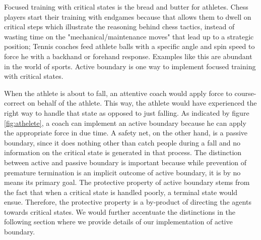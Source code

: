 \documentclass[journal]{IEEEtran}
\begin{document}
Focused training with critical states is the bread and butter for athletes. Chess players start their training with endgames because that allows them to dwell on critical steps which illustrate the reasoning behind chess tactics, instead of wasting time on the "mechanical/maintenance moves" that lead up to a strategic position; Tennis coaches feed athlete balls with a specific angle and spin speed to force he with a backhand or forehand response. Examples like this are abundant in the world of sports. Active boundary is one way to implement focused training with critical states. 

When the athlete is about to fall, an attentive coach would apply force to course-correct on behalf of the athlete. This way, the athlete would have experienced the right way to handle that state as opposed to just falling. As indicated by figure \ref{fig:athelete}, a coach can implement an active boundary because he can apply the appropriate force in due time. A safety net, on the other hand, is a passive boundary, since it does nothing other than catch people during a fall and no information on the critical state is generated in that process. The distinction between active and passive boundary is important because while prevention of premature termination is an implicit outcome of active boundary, it is by no means its primary goal. The protective property of active boundary stems from the fact that when a critical state is handled poorly, a terminal state would ensue. Therefore, the protective property is a by-product of directing the agents towards critical states. We would further accentuate the distinctions in the following section where we provide details of our implementation of active boundary. 
\end{document}
